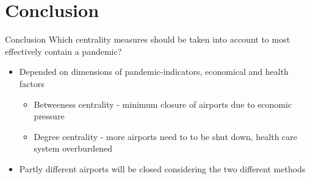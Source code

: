 \documentclass[10pt]{beamer}
\begin{document}
\section{Conclusion}
\begin{frame}{Conclusion}
Which centrality measures should be taken into account to most effectively contain a pandemic?
 \begin{itemize}
    \item Depended on dimensions of pandemic-indicators, economical and health factors
    \begin{itemize}
        \item Betweeness centrality - minimum closure of airports due to economic pressure 
        \item Degree centrality - more airports need to to be shut down, health care system overburdened 
    \end{itemize}
    \item Partly different airports will be closed considering the two different methods
 \end{itemize}
\end{frame}
\end{document}
